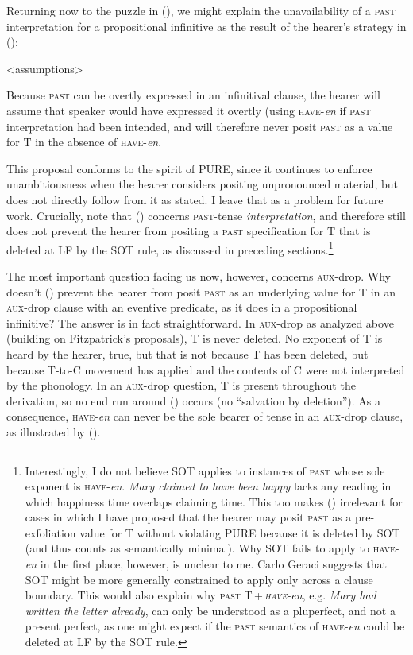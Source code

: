 \documentclass[output=paper]{langscibook}
\begin{document}
Returning now to the puzzle in (), we might explain the unavailability of a \textsc{past} interpretation for a propositional infinitive as the result of the hearer's strategy in ():\largerpage

\pex<assumptions>

Because \textsc{past} can be overtly expressed in an infinitival clause, the hearer will assume that speaker would have expressed it overtly (using \textsc{have}-\textit{en} if \textsc{past} interpretation had been intended, and will therefore never posit \textsc{past} as a value for T in the absence of \textsc{have}-\textit{en}.
\xe

\noindent This proposal conforms to the spirit of PURE, since it continues to enforce unambitiousness when the hearer considers positing unpronounced material, but does not directly follow from it as stated. I leave that as a problem for future work. Crucially, note that () concerns \textsc{past}-tense \textit{interpretation}, and therefore still does not prevent the hearer from positing a \textsc{past} specification for T that is deleted at LF by the SOT rule, as discussed in preceding sections.\footnote{Interestingly, I do not believe SOT applies to instances of \textsc{past} whose sole exponent is \textsc{have-}\textit{en}. \textit{Mary claimed to have been happy} lacks any reading in which happiness time overlaps claiming time. This too makes () irrelevant for cases in which I have proposed that the hearer may posit \textsc{past} as a pre-exfoliation value for T without violating PURE because it is deleted by SOT (and thus counts as semantically minimal). Why SOT fails to apply to \textsc{have}-\textit{en} in the first place, however, is unclear to me. Carlo Geraci suggests that SOT might be more generally constrained to apply only across a clause boundary. This would also explain why \textsc{past} T\,+\,\textit{\textsc{have-}}\textit{en}, e.g. \textit{Mary had written the letter already}, can only be understood as a pluperfect, and not a present perfect, as one might expect if the \textsc{past} semantics of \textsc{have-}\textit{en} could be deleted at LF by the SOT rule.}  

The most important question facing us now, however, concerns \textsc{aux}-drop. Why doesn't ()  prevent the hearer from posit \textsc{past} as an underlying value for T in an \textsc{aux}-drop clause with an eventive predicate, as it does in a propositional infinitive? The answer is in fact straightforward. In \textsc{aux}-drop as analyzed above (building on Fitzpatrick's proposals), T is never deleted. No exponent of T is heard by the hearer, true, but that is not because T has been deleted, but because T-to-C movement has applied and the contents of C were not interpreted by the phonology. In an \textsc{aux}-drop question, T is present throughout the derivation, so no end run around () occurs (no “salvation by deletion”). As a consequence, \textsc{have}-\textit{en} can never be the sole bearer of tense in an \textsc{aux}-drop clause, as illustrated by ().
\end{document}
